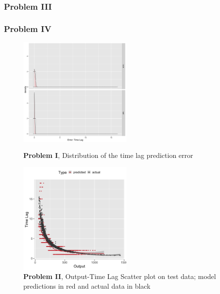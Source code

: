 \documentclass[twoside]{article}
\begin{document}
\subsubsection{Problem III}

\subsubsection{Problem IV}

\begin{figure}[h]
\vspace{.3in}

\centerline{\label{fig:problem1}\includegraphics[width=0.5\textwidth]{figures/exp1_hist_errors_timelag.png}}
\vspace{.3in}
\caption{\textbf{Problem I}, Distribution of the time lag prediction error}
\end{figure}



\begin{figure}[h]\label{fig:problem2_scatter}
\vspace{.3in}
\centerline{\includegraphics[width=0.5\textwidth]{figures/exp2_scatter_v_tl.png}}
\vspace{.3in}
\caption{\textbf{Problem II}, Output-Time Lag Scatter plot on test data; model predictions in red and actual data in black}
\end{figure}
\end{document}
